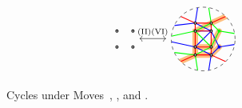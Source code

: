 \begin{figure}[ht]
\[\begin{tikzcd}
\begin{tikzpicture}[baseline=-.5ex,scale=0.5]
\draw[thick,fill=white] (1/2,1/2) circle (2pt) (-1/2,1/2)circle (2pt) (1/2,-1/2)circle (2pt) (-1/2,-1/2) circle (2pt);
\end{tikzpicture}
\arrow[r,leftrightarrow,"\Move{II} \Move{VI}"]&
\begin{tikzpicture}[baseline=-.5ex,scale=0.5]
\draw [dashed] (0,0) circle [radius=2];
\clip (0,0) circle [radius=2];
\draw[color=cyclecolor1, opacity=0.5, line width=5, line cap=round] (45:2)-- (0.5,1) -- (-0.5,0.5) -- (-0.5,-1) -- (-135:2)
(-0.5,-0.5) -- (0.5,-0.5) -- (1,0.5) (-0.5,-1) -- (0.5,-1) -- (1,-0.5);
\draw[blue, thick] (155:2) -- (-1/2,1) -- (100:2)
(-1/2,1) -- (1/2, 1/2)
(-175:2) -- (-1/2,-1/2) -- (1/2,-1) -- (-80:2)
(-1/2,1/2) -- (1/2, 1/2) -- (-1/2,-1/2) (1/2,1/2) -- (1,-1/2) -- (-10:2) (1/2, -1) -- (1,-1/2);
\draw[red, thick] (135:2) -- (-0.5,1) -- (-0.5,-1) -- (-135:2) 
(45:2) -- (0.5,1) -- (0.5,-1) -- (-45:2)
(-0.5,1) -- (0.5,1)
(-1/2,1/2) -- (0.5,1/2)
(-1/2,-1/2) -- (1/2,-1/2)
(-0.5,-1) -- (1/2,-1);
\draw[green, thick] (175:2) -- (-1/2,1/2) -- (1/2,1) -- (80:2)
(-155:2) -- (-1/2,-1) -- (-100:2)
(-1/2,1/2) -- (1/2,-1/2) -- (-1/2,-1)
(1/2,1) -- (1,1/2) -- (1/2,-1/2)
(1,1/2) -- (10:2);
\draw[thick,blue, fill=blue] (1,-0.5) circle (2pt);
\draw[thick,red, fill=red] ;
\draw[thick,green, fill=green](1,1/2) circle (2pt) ;
\draw[thick,fill=white] (-1/2,1) circle (2pt) (-1/2,1/2)circle (2pt) (-1/2,-1/2)circle (2pt) (-1/2,-1)circle (2pt) (1/2,1)circle (2pt) (1/2,1/2) circle (2pt) (1/2,-1/2) circle (2pt)  (1/2,-1) circle (2pt);
\end{tikzpicture} 
\end{tikzcd}
\]
\caption{Cycles under Moves~, ,  and .}
\label{fig:cycles under moves}
\end{figure}


